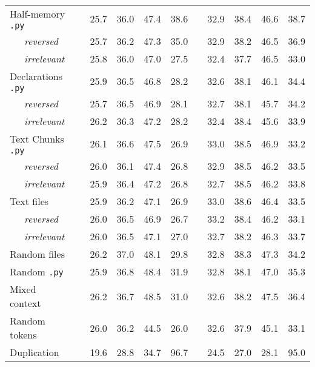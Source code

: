 \documentclass{standalone}
\begin{document}
\begin{table}
\begin{tabular}{lc cc>{\columncolor{gray!30}}cc c cc>{\columncolor{gray!30}}cc}
    \cmidrule(lr){1-1}
    Half-memory \texttt{.py} & & 25.7 & 36.0 & 47.4 & 38.6 & & 32.9 & 38.4 & 46.6 & 38.7 \\
    ~~~\textit{reversed} & & 25.7 & 36.2 & 47.3 & 35.0 & & 32.9 & 38.2 & 46.5 & 36.9 \\
    ~~~\textit{irrelevant} & & 25.8 & 36.0 & 47.0 & 27.5 & & 32.4 & 37.7 & 46.5 & 33.0 \\
    
    \cmidrule(lr){1-1}
    Declarations \texttt{.py} & & 25.9 & 36.5 & 46.8 & 28.2 & & 32.6 & 38.1 & 46.1 & 34.4 \\
    ~~~\textit{reversed} & & 25.7 & 36.5 & 46.9 & 28.1 & & 32.7 & 38.1 & 45.7 & 34.2 \\
    ~~~\textit{irrelevant} & & 26.2 & 36.3 & 47.2 & 28.2 & & 32.4 & 38.4 & 45.6 & 33.9 \\
    
    \cmidrule(lr){1-1}
    Text Chunks \texttt{.py} & & 26.1 & 36.6 & 47.5 & 26.9 & & 33.0 & 38.5 & 46.9 & 33.2 \\
    ~~~\textit{reversed} & & 26.0 & 36.1 & 47.4 & 26.8 & & 32.9 & 38.5 & 46.2 & 33.5 \\
    ~~~\textit{irrelevant} & & 25.9 & 36.4 & 47.2 & 26.8 & & 32.7 & 38.5 & 46.2 & 33.8 \\
    
    \cmidrule(lr){1-1}
    Text files & & 25.9 & 36.2 & 47.1 & 26.9 & & 33.0 & 38.6 & 46.4 & 33.5 \\
    ~~~\textit{reversed} & & 26.0 & 36.5 & 46.9 & 26.7 & & 33.2 & 38.4 & 46.2 & 33.1 \\
    ~~~\textit{irrelevant} & & 26.0 & 36.5 & 47.1 & 27.0 & & 32.7 & 38.2 & 46.3 & 33.7 \\
    
    \cmidrule(lr){1-1}
    Random files & & 26.2 & 37.0 & 48.1 & 29.8 & & 32.8 & 38.3 & 47.3 & 34.2 \\
    
    \cmidrule(lr){1-1}
    Random \texttt{.py} & & 25.9 & 36.8 & 48.4 & 31.9 & & 32.8 & 38.1 & 47.0 & 35.3 \\

    \cmidrule(lr){1-1}
    Mixed context & & 26.2 & 36.7 & 48.5 & 31.0 & & 32.6 & 38.2 & 47.5 & 36.4 \\
    
    \midrule
    Random tokens & & 26.0 & 36.2 & 44.5 & 26.0 & & 32.6 & 37.9 & 45.1 & 33.1 \\
    
    \cmidrule(lr){1-1}
    Duplication & & 19.6 & 28.8 & 34.7 & 96.7 & & 24.5 & 27.0 & 28.1 & 95.0 \\
    

\end{tabular}
\end{table}
\end{document}
